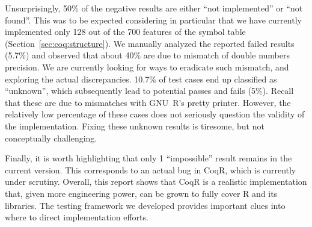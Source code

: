 \documentclass[
    sigplan,
    10pt,
    review, %
    natbib=false %
 ]{acmart}
\newcommand\et[1]{\todo[color=blue!20,size=\scriptsize]{#1}}
\newcommand\td[1]{\todo[color=green!20,size=\scriptsize]{#1}}
\newcommand\CoqR{CoqR}
\begin{document}
Unsurprisingly, 50\% of the negative results are either ``not implemented'' or ``not found''. This was to be expected considering in particular that we have currently implemented only 128 out of the 700 features of the symbol table (Section~\ref{sec:coq:structure}).
%
We manually analyzed the reported failed results (5.7\%) and observed that about 40\% are due to mismatch of double numbers precision. We are currently looking for ways to eradicate such mismatch, and exploring the actual discrepancies.
%
10.7\% of test cases end up classified as ``unknown'', which subsequently lead to potential passes and fails (5\%).
Recall that these are due to mismatches with GNU~R's pretty printer. However, the relatively low percentage of these cases does not seriously question the validity of the implementation. Fixing these unknown results is tiresome, but not conceptually challenging.


Finally, it is worth highlighting that only 1 ``impossible'' result remains in the current version.  This corresponds to an actual bug in \CoqR{}, which is currently under scrutiny.
Overall, this report shows that \CoqR{} is a realistic implementation that, given more engineering power, can be grown to fully cover R and its libraries. The testing framework we developed provides important clues into where to direct implementation efforts.
\end{document}
